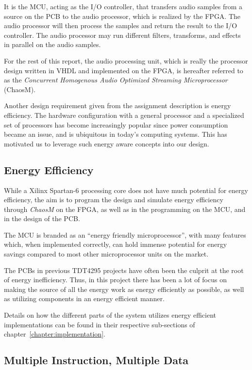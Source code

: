 It is the MCU, acting as the I/O controller, that transfers audio samples from a
source on the PCB to the audio processor, which is realized by the FPGA. The
audio processor will then process the samples and return the result to the I/O
controller. The audio processor may run different filters, transforms, and
effects in parallel on the audio samples.

For the rest of this report, the audio processing unit, which is really the
processor design written in VHDL and implemented on the FPGA, is hereafter
referred to as the \textit{Concurrent Homogenous Audio Optimized Streaming
Microprocessor} (ChaosM).

Another design requirement given from the assignment description is energy
efficiency. The hardware configuration with a general processor and a
specialized set of processors has become increasingly popular since power
consumption became an issue, and is ubiquitous in today's computing systems.
This has motivated us to leverage such energy aware concepts into our design.

\subsection{Energy Efficiency}

While a Xilinx Spartan-6\cite{fpga-chip} processing core does not have much
potential for energy efficiency, the aim is to program the design and simulate
energy efficiency through \textit{ChaosM} on the FPGA, as well as in the
programming on the MCU, and in the design of the PCB.

The MCU is branded as an ``energy friendly microprocessor'', with many features
which, when implemented correctly, can hold immense potential for energy savings
compared to most other microprocessor units on the market.

The PCBs in previous TDT4295 projects have often been the culprit at the root of
energy inefficiency. Thus, in this project there has been a lot of focus on
making the source of all the energy work as energy efficiently as possible, as
well as utilizing components in an energy efficient manner.

Details on how the different parts of the system utilizes energy efficient
implementations can be found in their respective sub-sections of
chapter~\ref{chapter:implementation}.

\subsection{Multiple Instruction, Multiple Data}


